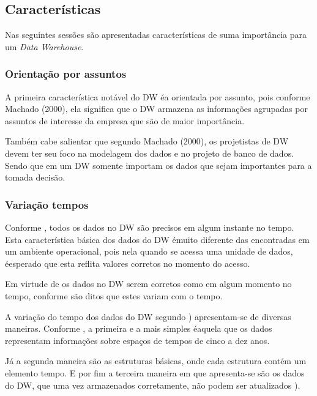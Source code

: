 \subsection{Caracter\'{i}sticas}

Nas seguintes sess\~{o}es s\~{a}o apresentadas caracter\'{i}sticas de suma importância para um \textit{Data Warehouse}.

\subsubsection{Orienta\c{c}\~{a}o por assuntos}

A primeira caracter\'{i}stica not\'{a}vel do DW \'{e}a orientada por assunto, pois conforme Machado (2000), ela significa que o DW armazena as informa\c{c}\~{o}es agrupadas por assuntos de interesse da empresa que s\~{a}o de maior importância.

Tamb\'{e}m cabe salientar que segundo Machado (2000), os projetistas de DW devem ter seu foco na modelagem dos dados e no projeto de banco de dados. Sendo que em um DW somente importam os dados que sejam importantes para a tomada decis\~{a}o.

\subsubsection{Varia\c{c}\~{a}o tempos}

Conforme \cite{si-inmon-1997}, todos os dados no DW s\~{a}o precisos em algum instante no tempo. Esta caracter\'{i}stica b\'{a}sica dos dados do DW \'{e}muito diferente das encontradas em um ambiente operacional, pois nela quando se acessa uma unidade de dados, \'{e}esperado que esta reflita valores corretos no momento do acesso.

Em virtude de os dados no DW serem corretos como em algum momento no tempo, conforme \cite{si-inmon-1997} s\~{a}o ditos que estes variam com o tempo.

A varia\c{c}\~{a}o do tempo dos dados do DW segundo \cite{si-inmon-1997}) apresentam-se de diversas maneiras. Conforme \cite{bi-machado-2018}, a primeira e a mais simples \'{e}aquela que os dados representam informa\c{c}\~{o}es sobre espa\c{c}os de tempos de cinco a dez anos.

J\'{a} a segunda maneira s\~{a}o as estruturas b\'{a}sicas, onde cada estrutura cont\'{e}m um elemento tempo. E por fim a terceira maneira em que apresenta-se s\~{a}o os dados do DW, que uma vez armazenados corretamente, n\~{a}o podem ser atualizados \cite{si-inmon-1997}).

